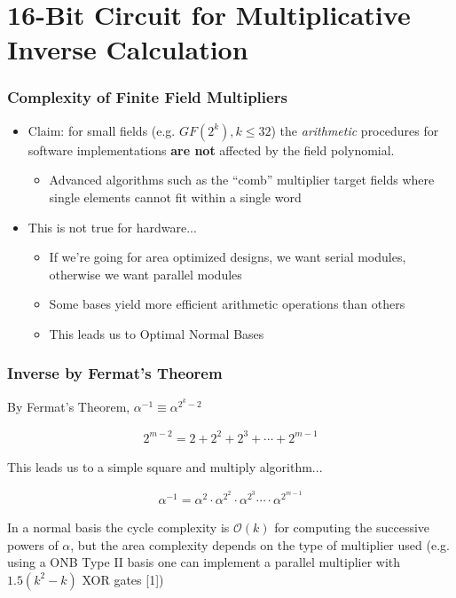 \documentclass[handout]{beamer}
\begin{document}
\section{16-Bit Circuit for Multiplicative Inverse Calculation}
\begin{frame}
	\frametitle{Complexity of Finite Field Multipliers}
	\begin{itemize}
		\item Claim: for small fields (e.g. $GF(2^k), k \leq 32$) the \emph{arithmetic} procedures for 
		software implementations \textbf{are not} affected by the field polynomial.
		\begin{itemize}
			\item Advanced algorithms such as the ``comb'' multiplier target fields where
			single elements cannot fit within a single word
		\end{itemize}
		\item This is not true for hardware...
		\begin{itemize}
			\item If we're going for area optimized designs, we want serial modules, otherwise
			we want parallel modules
			\item Some bases yield more efficient arithmetic operations than others
			\item This leads us to Optimal Normal Bases
		\end{itemize}
	\end{itemize}
\end{frame}

\begin{frame}
	\frametitle{Inverse by Fermat's Theorem}
	By Fermat's Theorem, $\alpha^{-1} \equiv \alpha^{2^k - 2}$
	
	\medskip
	
	\begin{align*}
		2^{m-2} = 2 + 2^2 + 2^3 + \dotsb + 2^{m-1}
	\end{align*}
	
	This leads us to a simple square and multiply algorithm...
	
	\begin{align*}
		\alpha^{-1} = \alpha^2 \cdot \alpha^{2^{2}} \cdot \alpha^{2^{3}} \dotsb \cdot \alpha^{2^{m-1}}
	\end{align*}
	
	In a normal basis the cycle complexity is $\mathcal{O}(k)$ for computing the successive powers of $\alpha$, but the 
	area complexity depends on the type of multiplier used (e.g. using a ONB Type II basis one can implement a parallel 
	multiplier with $1.5(k^2 - k)$ XOR gates [1])
\end{frame}
\end{document}
